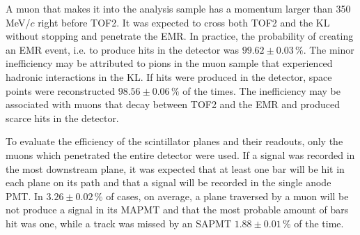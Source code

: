 
A muon that makes it into the analysis sample has a momentum larger than 350\,MeV/$c$ right before TOF2. It was expected to cross both TOF2 and the KL without stopping and penetrate the EMR. In practice, the probability of creating an EMR event, i.e. to produce hits in the detector was $99.62\pm0.03\,\%$. The minor inefficiency may be attributed to pions in the muon sample that experienced hadronic interactions in the KL. If hits were produced in the detector, space points were reconstructed $98.56\pm0.06\,\%$ of the times.
The inefficiency may be associated with muons that decay between TOF2 and the EMR and produced scarce hits in the detector.

To evaluate the efficiency of the scintillator planes and their readouts, only the muons which penetrated the entire detector were used. If a signal was recorded in the most downstream plane, it was expected that at least one bar will be hit in each plane on its path and that a signal will be recorded in the single anode PMT.
In $3.26\pm0.02\,\%$ of cases, on average, a plane traversed by a muon will be not produce a signal in its MAPMT and that the most probable amount of bars hit was one, while a track was missed by an SAPMT $1.88\pm0.01\,\%$ of the time. 

%

